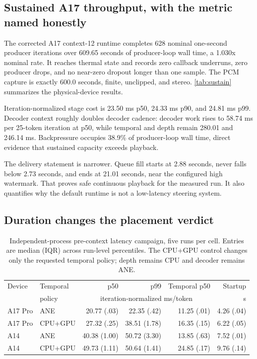 \documentclass[10pt]{article}
\begin{document}
\subsection{Sustained A17 throughput, with the metric named honestly}
The corrected A17 context-12 runtime completes 628 nominal one-second producer iterations over 609.65 seconds of producer-loop wall time, a 1.030x nominal rate. It reaches \texttt{} thermal state and records zero callback underruns, zero producer drops, and no near-zero dropout longer than one sample. The PCM capture is exactly 600.0 seconds, finite, unclipped, and stereo. \cref{tab:sustain} summarizes the physical-device results.

Iteration-normalized stage cost is 23.50 ms p50, 24.33 ms p90, and 24.81 ms p99. Decoder context roughly doubles decoder cadence: decoder work rises to 58.74 ms per 25-token iteration at p50, while temporal and depth remain 280.01 and 246.14 ms. Backpressure occupies 38.9\% of producer-loop wall time, direct evidence that sustained capacity exceeds playback.

The delivery statement is narrower. Queue fill starts at 2.88 seconds, never falls below 2.73 seconds, and ends at 21.01 seconds, near the configured high watermark. That proves safe continuous playback for the measured run. It also quantifies why the default runtime is not a low-latency steering system.

\subsection{Duration changes the placement verdict}

\begin{table}[H]
\centering
\small
\caption{Independent-process pre-context latency campaign, five runs per cell. Entries are
median (IQR) across run-level percentiles. The CPU+GPU control changes only the
requested temporal policy; depth remains CPU and decoder remains ANE.}
\label{tab:dispersion}
\begin{tabular}{@{}llrrrr@{}}
\toprule
Device & Temporal & p50 & p99 & Temporal p50 & Startup \\
 & policy & \multicolumn{3}{c}{iteration-normalized ms/token} & s \\
\midrule
A17 Pro & ANE & 20.77 (.03) & 22.35 (.42) & 11.25 (.01) & 4.26 (.04) \\
A17 Pro & CPU+GPU & 27.32 (.25) & 38.51 (1.78) & 16.35 (.15) & 6.22 (.05) \\
A14 & ANE & 40.38 (1.00) & 50.72 (3.30) & 13.85 (.63) & 7.52 (.01) \\
A14 & CPU+GPU & 49.73 (1.11) & 50.64 (1.41) & 24.85 (.17) & 9.76 (.14) \\
\bottomrule
\end{tabular}
\end{table}
\end{document}
